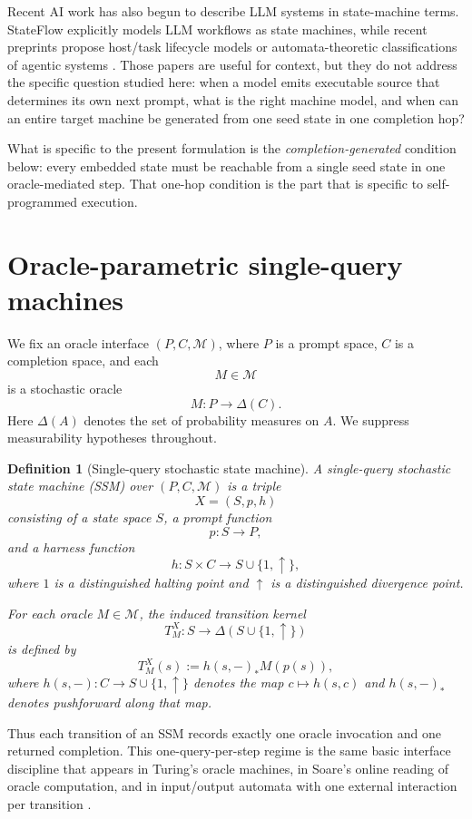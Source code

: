 \documentclass[11pt]{article}
\newtheorem{definition}{Definition}[section]
\begin{document}
Recent AI work has also begun to describe LLM systems in state-machine terms. StateFlow explicitly models LLM workflows as state machines, while recent preprints propose host/task lifecycle models or automata-theoretic classifications of agentic systems \cite{StateFlow24,Allegrini25,Koohestani25}. Those papers are useful for context, but they do not address the specific question studied here: when a model emits executable source that determines its own next prompt, what is the right machine model, and when can an entire target machine be generated from one seed state in one completion hop?

What is specific to the present formulation is the \emph{completion-generated} condition below: every embedded state must be reachable from a single seed state in one oracle-mediated step. That one-hop condition is the part that is specific to self-programmed execution.


\section{Oracle-parametric single-query machines}

We fix an oracle interface $(P,C,\mathcal{M})$, where $P$ is a prompt space, $C$ is a completion space, and each
\[
M \in \mathcal{M}
\]
is a stochastic oracle
\[
M : P \to \Delta(C).
\]
Here $\Delta(A)$ denotes the set of probability measures on $A$. We suppress measurability hypotheses throughout.

\begin{definition}[Single-query stochastic state machine]\label{def:ssm}
A \emph{single-query stochastic state machine} (SSM) over $(P,C,\mathcal{M})$ is a triple
\[
X=(S,p,h)
\]
consisting of a state space $S$, a prompt function
\[
p:S\to P,
\]
and a harness function
\[
h:S\times C\to S\cup\{1,\uparrow\},
\]
where $1$ is a distinguished halting point and $\uparrow$ is a distinguished divergence point.

For each oracle $M\in\mathcal{M}$, the induced transition kernel
\[
T_M^X:S\to\Delta(S\cup\{1,\uparrow\})
\]
is defined by
\[
T_M^X(s):=h(s,-)_*M(p(s)),
\]
where $h(s,-):C\to S\cup\{1,\uparrow\}$ denotes the map $c\mapsto h(s,c)$ and $h(s,-)_*$ denotes pushforward along that map.
\end{definition}

Thus each transition of an SSM records exactly one oracle invocation and one returned completion. This one-query-per-step regime is the same basic interface discipline that appears in Turing's oracle machines, in Soare's online reading of oracle computation, and in input/output automata with one external interaction per transition \cite{Turing39,Soare09,LynchTuttle89}.
\end{document}

